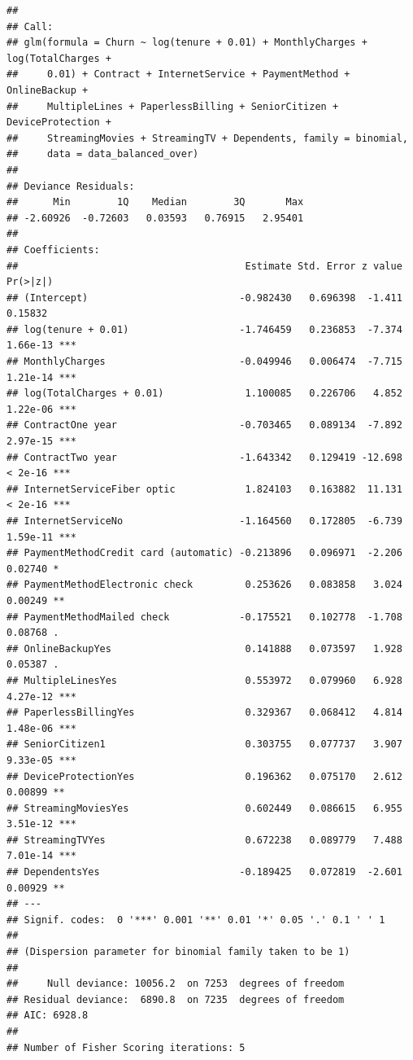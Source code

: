 \documentclass[
  twoside]{article}
\begin{document}
\begin{verbatim}
## 
## Call:
## glm(formula = Churn ~ log(tenure + 0.01) + MonthlyCharges + log(TotalCharges + 
##     0.01) + Contract + InternetService + PaymentMethod + OnlineBackup + 
##     MultipleLines + PaperlessBilling + SeniorCitizen + DeviceProtection + 
##     StreamingMovies + StreamingTV + Dependents, family = binomial, 
##     data = data_balanced_over)
## 
## Deviance Residuals: 
##      Min        1Q    Median        3Q       Max  
## -2.60926  -0.72603   0.03593   0.76915   2.95401  
## 
## Coefficients:
##                                       Estimate Std. Error z value Pr(>|z|)    
## (Intercept)                          -0.982430   0.696398  -1.411  0.15832    
## log(tenure + 0.01)                   -1.746459   0.236853  -7.374 1.66e-13 ***
## MonthlyCharges                       -0.049946   0.006474  -7.715 1.21e-14 ***
## log(TotalCharges + 0.01)              1.100085   0.226706   4.852 1.22e-06 ***
## ContractOne year                     -0.703465   0.089134  -7.892 2.97e-15 ***
## ContractTwo year                     -1.643342   0.129419 -12.698  < 2e-16 ***
## InternetServiceFiber optic            1.824103   0.163882  11.131  < 2e-16 ***
## InternetServiceNo                    -1.164560   0.172805  -6.739 1.59e-11 ***
## PaymentMethodCredit card (automatic) -0.213896   0.096971  -2.206  0.02740 *  
## PaymentMethodElectronic check         0.253626   0.083858   3.024  0.00249 ** 
## PaymentMethodMailed check            -0.175521   0.102778  -1.708  0.08768 .  
## OnlineBackupYes                       0.141888   0.073597   1.928  0.05387 .  
## MultipleLinesYes                      0.553972   0.079960   6.928 4.27e-12 ***
## PaperlessBillingYes                   0.329367   0.068412   4.814 1.48e-06 ***
## SeniorCitizen1                        0.303755   0.077737   3.907 9.33e-05 ***
## DeviceProtectionYes                   0.196362   0.075170   2.612  0.00899 ** 
## StreamingMoviesYes                    0.602449   0.086615   6.955 3.51e-12 ***
## StreamingTVYes                        0.672238   0.089779   7.488 7.01e-14 ***
## DependentsYes                        -0.189425   0.072819  -2.601  0.00929 ** 
## ---
## Signif. codes:  0 '***' 0.001 '**' 0.01 '*' 0.05 '.' 0.1 ' ' 1
## 
## (Dispersion parameter for binomial family taken to be 1)
## 
##     Null deviance: 10056.2  on 7253  degrees of freedom
## Residual deviance:  6890.8  on 7235  degrees of freedom
## AIC: 6928.8
## 
## Number of Fisher Scoring iterations: 5
\end{verbatim}
\end{document}
